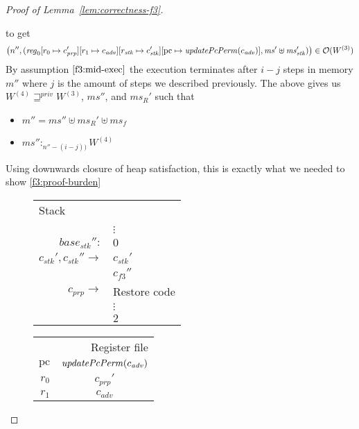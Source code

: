 \documentclass[a4paper]{article}
\newcommand{\update}[2]{[#1 \mapsto #2]}
\newcommand{\var}[1]{\mathit{#1}}
\newcommand{\hs}{\var{ms}}
\newcommand{\ms}{\hs}
\newcommand{\pcreg}{\mathrm{pc}}
\newcommand{\start}{\var{base}}
\newcommand{\reg}{\var{reg}}
\newcommand{\heap}{\var{mem}}
\newcommand{\adv}{\var{adv}}
\newcommand{\stk}{\var{stk}}
\newcommand{\plainfun}[2]{
  \ifthenelse{\equal{#2}{}}
  {\mathit{#1}}
  {\mathit{#1}(#2)}
}
\newcommand{\updatePcPerm}[1]{\plainfun{updatePcPerm}{#1}}
\newcommand{\futurestr}{\mathbin{\sqsupseteq}^{\var{priv}}}
\newcommand{\heapSat}[3][\heap]{#1 :_{#2} #3}
\newcommand{\memSat}[3][n]{\heapSat[#2]{#1}{#3}}
\newcommand{\observations}{\mathcal{O}}
\newcommand{\npair}[2][n]{\left(#1,#2 \right)}
\begin{document}
\begin{lemma}
\begin{proof}[Proof of Lemma~\ref{lem:correctness-f3}]
\begin{enumproof}[start=3]
\begin{enumproof}[start=3]
\begin{enumproof}[resume]
\begin{enumproof}
\begin{enumproof}
          \end{enumproof}
        \end{enumproof}
      \end{enumproof}
      to get
      \[
        \npair[n'']{(\reg_0\update{r_0}{c_{\var{prp}}'}\update{r_1}{c_\adv}\update{r_\stk}{c_\stk'}\update{\pcreg}{\updatePcPerm{c_\adv}},\ms' \uplus \ms_\stk')} \in \observations(W^{(3)})
      \]
      By assumption $\ref{f3:mid-exec}$ the execution terminates after $i-j$ steps in memory $m''$ where $j$ is the amount of steps we described previously. The above gives us $W^{(4)} \futurestr W^{(3)}$, $\ms''$, and $\ms_R'$ such that
      \begin{itemize}
      \item $m'' = \ms'' \uplus \ms_R' \uplus \ms_f$
      \item $\memSat[n''-(i-j))]{\ms''}{W^{(4)}}$
      \end{itemize}
      Using downwards closure of heap satisfaction, this is exactly what we needed to show \ref{f3:proof-burden}
      \begin{figure}
        \centering
        \begin{tabular}[!h]{r | >{\raggedright\arraybackslash}p{3cm} |}
          \multicolumn{2}{l}{Stack} \\
          \cline{2-2}
       &         \\
       & $\vdots$ \\
          \cline{2-2}
          $\start_\stk'':$   & $0$\\
          \cline{2-2}
          $c_\stk',c_\stk'' \rightarrow$   & $c_\stk'$ \\
          \cline{2-2}
       & $c_{f3}''$ \\
          \cline{2-2}
          $c_{\var{prp}} \rightarrow$   & Restore code \\
       & $\vdots$ \\
          \cline{2-2}
       & $2$\\
          \cline{2-2}
        \end{tabular}
        \hspace{1cm}
        \begin{tabular}{r |c |}
          \multicolumn{2}{r}{Register file} \\
          \cline{2-2}
          $\pcreg$ & $\updatePcPerm{c_\adv}$\\
          \cline{2-2}
          $r_0$  &  $c_{\var{prp}}'$ \\
          \cline{2-2}
          $r_1$ & $c_\adv$ \\

\end{tabular}
\end{figure}
\end{enumproof}
\end{enumproof}
\end{proof}
\end{lemma}
\end{document}
